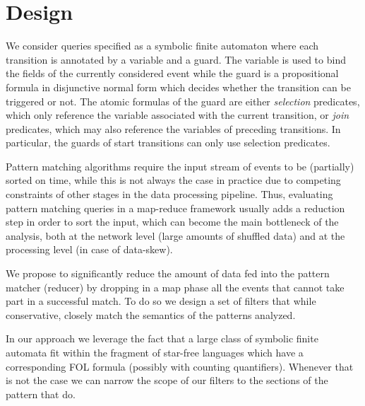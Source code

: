 \section{Design}


We consider queries specified as a symbolic finite automaton where each
transition is annotated by a variable and a guard.
The variable is used to bind the fields of the currently considered event while the guard is a propositional formula in disjunctive normal form which decides whether the transition can be triggered or not.  
The atomic formulas of the guard are either {\em selection} predicates, which only reference the variable associated with the current transition,
or {\em join} predicates, which may also reference the variables of preceding transitions.
In particular, the guards of start transitions can only use selection predicates.  
   
Pattern matching algorithms require the input stream of events to be (partially) sorted on time, while this is not always the case in practice due to competing constraints of other stages in the data processing pipeline. 
Thus, evaluating pattern matching queries in a map-reduce framework usually adds a reduction step in order to sort the input, which can become the main bottleneck of the analysis, both at the network level (large amounts of shuffled data) and at
the processing level (in case of data-skew).

 

We propose to significantly reduce the amount of data fed into the pattern
matcher (reducer) by dropping in a map phase all the events that cannot take
part in a successful match.
To do so we design a set of filters that while conservative, closely match the
semantics of the patterns analyzed.

\begin{comment}
We propose three levels of abstraction.
The first enforces the join constraints between different transitions as
expressed by join predicates within the transition guards.
The second one further imposes time windowing constraints (all events of a
successful match must occur within a timeout of the first event in the match).
Finally the last one enforces ordering constraints between {\em consecutive}
transitions of the pattern.
\end{comment}

In our approach we leverage the fact that a large class of symbolic finite
automata fit within the fragment of star-free languages which
have a corresponding FOL formula (possibly with counting quantifiers).
Whenever that is not the case we can narrow the scope of our filters to the
sections of the pattern that do.
 
